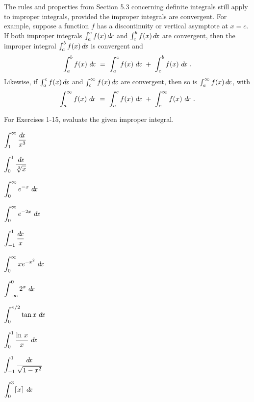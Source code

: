The rules and properties from Section 5.3 concerning definite integrals still
apply to improper integrals, provided the improper integrals are convergent.
For example, suppose a function $f$ has a discontinuity or vertical asymptote at
$x=c$. If both improper integrals $\int_a^{c} f(x)\,d\!x$ and
$\int_c^{b} f(x)\,d\!x$ are convergent, then the improper integral
$\int_a^{b} f(x)\,d\!x$ is convergent and
\[
\int_a^{b} f(x)~d\!x ~=~ \int_a^{c} f(x)~d\!x ~+~ \int_c^{b} f(x)~d\!x ~.
\]
Likewise, if $\int_a^{c} f(x)\,d\!x$ and $\int_c^{\infty} f(x)\,d\!x$ are
convergent, then so is $\int_a^{\infty} f(x)\,d\!x$, with
\[
\int_a^{\infty} f(x)~d\!x ~=~ \int_a^{c} f(x)~d\!x ~+~ \int_c^{\infty} f(x)~d\!x ~.
\]
\newpage
\startexercises\label{sec5dot5}
{\small
{}
\par\noindent For Exercises 1-15, evaluate the given improper integral.
\begin{enumerate}[\bfseries 1.]
\begin{multicols}{5}
 \item $\displaystyle\int_{1}^{\infty} \frac{\dx}{x^3}\vphantom{\displaystyle\int_{0}^{1}\frac{\dx}{\sqrt[3]{x}}}$
 \item $\displaystyle\int_{0}^{1} \frac{d\!x}{\sqrt[3]{x}}$
 \item $\displaystyle\int_{0}^{\infty} e^{-x} ~\dx\vphantom{\displaystyle\int_{0}^{1}\frac{\dx}{\sqrt[3]{x}}}$
 \item $\displaystyle\int_{0}^{\infty} e^{-2x} ~\dx\vphantom{\displaystyle\int_{0}^{1}\frac{\dx}{\sqrt[3]{x}}}$
 \item $\displaystyle\int_{-1}^{1} \frac{\dx}{x}\vphantom{\displaystyle\int_{0}^{1}\frac{\dx}{\sqrt[3]{x}}}$
\end{multicols}
\begin{multicols}{5}
 \item $\displaystyle\int_{0}^{\infty} x e^{-x^2}~\dx\vphantom{\displaystyle\int_{0}^{\pi/2}}$
 \item $\displaystyle\int_{-\infty}^{0} 2^x ~\dx\vphantom{\displaystyle\int_{0}^{\pi/2}}$
 \item $\displaystyle\int_{0}^{\pi/2} \tan x ~d\!x$
 \item $\displaystyle\int_{0}^{1} \frac{\ln\,x}{x}~\dx\vphantom{\displaystyle\int_{0}^{\pi/2}}$
 \item $\displaystyle\int_{-1}^{1} \frac{\dx}{\sqrt{1 - x^2}}\vphantom{\displaystyle\int_{0}^{\pi/2}}$
\end{multicols}
\begin{multicols}{5}
 \item $\displaystyle\int_{0}^{3} \lceil x \rceil ~\dx\vphantom{\displaystyle\int_{0}^{1} \frac{\dx}{(x - 1)^3}}$

\end{multicols}
\end{enumerate}}
